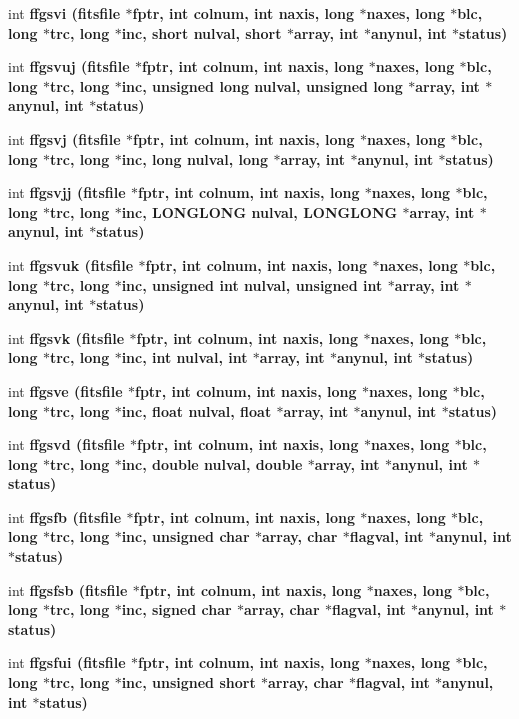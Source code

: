 \begin{CompactItemize}
\item 
int \bf{ffgsvi} (\bf{fitsfile} $\ast$fptr, int colnum, int naxis, long $\ast$naxes, long $\ast$blc, long $\ast$trc, long $\ast$inc, short nulval, short $\ast$array, int $\ast$anynul, int $\ast$status)
\item 
int \bf{ffgsvuj} (\bf{fitsfile} $\ast$fptr, int colnum, int naxis, long $\ast$naxes, long $\ast$blc, long $\ast$trc, long $\ast$inc, unsigned long nulval, unsigned long $\ast$array, int $\ast$anynul, int $\ast$status)
\item 
int \bf{ffgsvj} (\bf{fitsfile} $\ast$fptr, int colnum, int naxis, long $\ast$naxes, long $\ast$blc, long $\ast$trc, long $\ast$inc, long nulval, long $\ast$array, int $\ast$anynul, int $\ast$status)
\item 
int \bf{ffgsvjj} (\bf{fitsfile} $\ast$fptr, int colnum, int naxis, long $\ast$naxes, long $\ast$blc, long $\ast$trc, long $\ast$inc, \bf{LONGLONG} nulval, \bf{LONGLONG} $\ast$array, int $\ast$anynul, int $\ast$status)
\item 
int \bf{ffgsvuk} (\bf{fitsfile} $\ast$fptr, int colnum, int naxis, long $\ast$naxes, long $\ast$blc, long $\ast$trc, long $\ast$inc, unsigned int nulval, unsigned int $\ast$array, int $\ast$anynul, int $\ast$status)
\item 
int \bf{ffgsvk} (\bf{fitsfile} $\ast$fptr, int colnum, int naxis, long $\ast$naxes, long $\ast$blc, long $\ast$trc, long $\ast$inc, int nulval, int $\ast$array, int $\ast$anynul, int $\ast$status)
\item 
int \bf{ffgsve} (\bf{fitsfile} $\ast$fptr, int colnum, int naxis, long $\ast$naxes, long $\ast$blc, long $\ast$trc, long $\ast$inc, float nulval, float $\ast$array, int $\ast$anynul, int $\ast$status)
\item 
int \bf{ffgsvd} (\bf{fitsfile} $\ast$fptr, int colnum, int naxis, long $\ast$naxes, long $\ast$blc, long $\ast$trc, long $\ast$inc, double nulval, double $\ast$array, int $\ast$anynul, int $\ast$status)
\item 
int \bf{ffgsfb} (\bf{fitsfile} $\ast$fptr, int colnum, int naxis, long $\ast$naxes, long $\ast$blc, long $\ast$trc, long $\ast$inc, unsigned char $\ast$array, char $\ast$flagval, int $\ast$anynul, int $\ast$status)
\item 
int \bf{ffgsfsb} (\bf{fitsfile} $\ast$fptr, int colnum, int naxis, long $\ast$naxes, long $\ast$blc, long $\ast$trc, long $\ast$inc, signed char $\ast$array, char $\ast$flagval, int $\ast$anynul, int $\ast$status)
\item 
int \bf{ffgsfui} (\bf{fitsfile} $\ast$fptr, int colnum, int naxis, long $\ast$naxes, long $\ast$blc, long $\ast$trc, long $\ast$inc, unsigned short $\ast$array, char $\ast$flagval, int $\ast$anynul, int $\ast$status)

\end{CompactItemize}
